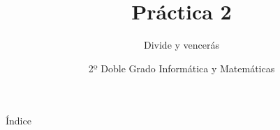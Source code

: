 \documentclass[compress]{beamer}
\title{Práctica 2}                                               %
\subtitle{Divide y vencerás}                                  %
\date{2º Doble Grado Informática y Matemáticas}                                                            %
\begin{document}
\begin{frame}
\titlepage
\end{frame}

\begin{frame}{Índice}
  \hypertarget{index}{}
  \tableofcontents
  
\end{frame}
\end{document}
